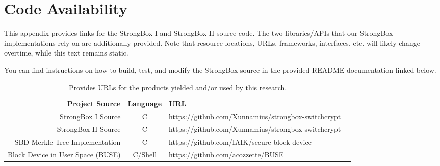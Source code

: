 \renewcommand\thechapter{A}
\chapter{Code Availability} \label{app:availability}

This appendix provides links for the StrongBox I and StrongBox II source code.
The two libraries/APIs that our StrongBox implementations rely on are
additionally provided. Note that resource locations, URLs, frameworks,
interfaces, etc. will likely change overtime, while this text remains static.

You can find instructions on how to build, test, and modify the StrongBox source
in the provided README documentation linked below.

\begin{table}
    \centering
    \caption{Provides URLs for the products yielded and/or used by this research.}
    \begin{tabular}{|r|c|l|l}
        \cline{1-3}
        \textbf{Project Source} & \textbf{Language} & \textbf{URL} & \\
        \cline{1-3}
        StrongBox I Source & C & https://github.com/Xunnamius/strongbox-switchcrypt & \\
        StrongBox II Source & C & https://github.com/Xunnamius/strongbox-switchcrypt & \\
        SBD Merkle Tree Implementation & C & https://github.com/IAIK/secure-block-device & \\
        Block Device in User Space (BUSE) & C/Shell & https://github.com/acozzette/BUSE & \\
        \cline{1-3}
    \end{tabular}
\end{table}


